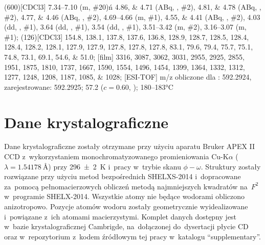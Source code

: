 \begin{fullexp}
	\NMR(600)[CDCl3] \numrange{7.34}{7.10} (m, \#{20})ń \numlist{4.86;4.71} (ABq, , \#{2}), \numlist{4.81;4.78} (ABq, , \#{2}), \numlist{4.77;4.46} (ABq, , \#{2}), \numrange{4.69}{4.66} (m, \#{1}), \numlist{4.55;4.41} (ABq, , \#{2}), \num{4.03} (dd, , \#{1}), \num{3.64} (dd, , \#{1}), \num{3.54} (dd, , \#{1}), \numrange{3.51}{3.42} (m, \#{2}), \numrange{3.16}{3.07} (m, \#{1});
	(126)[CDCl3] \numlist{154.8; 138.1; 137.8; 137.6; 136.8; 128.9; 128.7; 128.5; 128.4; 128.4; 128.2; 128.1; 127.9; 127.9; 127.8; 127.8; 127.8; 83.1; 79.6; 79.4; 75.7; 75.1; 74.8; 73.1; 69.1; 54.6; 51.0};
	[film] \numlist{3316; 3087; 3062; 3031; 2955; 2925; 2855; 1951; 1875; 1810; 1737; 1667; 1590; 1554; 1496; 1454; 1399; 1364; 1332; 1312; 1277; 1248; 1208; 1187; 1085; 1028};
	[ESI-TOF] m/z obliczone dla : \num{592.2924}, zarejestrowane: \num{592.2925};
	\data{[$\alpha^{23}_D$]~$=$} \num{57.2} ($c = 0.60$, );
	 \numrange{180}{183}\si{\celsius}
\end{fullexp}


\section{Dane krystalograficzne}
Dane krystalograficzne zostały otrzymane przy użyciu aparatu Bruker APEX II CCD
  z~wykorzystaniem monochromatyzowanego promieniowania Cu-K$\alpha$
	($\lambda=\SI{1.54178}{\angstrom}$) przy \SI{296(2)}{\kelvin} i~pracy w~trybie skanu $\phi-\omega$.
Struktury zostały rozwiązane przy użyciu metod bezpośrednich SHELXS-2014 
	i~dopracowane za~pomocą pełnomacierzowych obliczeń metodą najmniejszych kwadratów na~$F^2$
	w~programie SHELX-2014.
Wszystkie atomy nie będące wodorami obliczono anizotropowo.
Pozycje atomów wodoru zostały geometrycznie wyidealizowane i~powiązane z~ich atomami macierzystymi.
Komplet danych dostępny jest w~bazie krystalograficznej Cambrigde, na~dołączonej do~dysertacji płycie CD oraz w~repozytorium\sidenote{\repourl}
	z~kodem źródłowym tej pracy w~katalogu \enquote{supplementary}.

